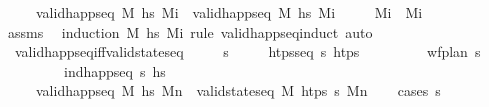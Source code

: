 \begin{isabellebody}
\ \ \ \ \ {\isachardoublequoteopen}valid{\isacharunderscore}{\kern0pt}happ{\isacharunderscore}{\kern0pt}seq\ M\ hs\ M\isactrlsub i{\isachardoublequoteclose}\ \ {\isachardoublequoteopen}valid{\isacharunderscore}{\kern0pt}happ{\isacharunderscore}{\kern0pt}seq\ M\ hs\ M\isactrlsub i{\isacharprime}{\kern0pt}{\isachardoublequoteclose}\isanewline
\ \ \ \ \ {\isachardoublequoteopen}M\isactrlsub i\ {\isacharequal}{\kern0pt}\ M\isactrlsub i{\isacharprime}{\kern0pt}{\isachardoublequoteclose}\isanewline
%
\isadelimproof
\ \ \ \ %
\endisadelimproof
%
\isatagproof
{}\isamarkupfalse%
\ assms\ \isamarkupfalse%
\ {\isacharparenleft}{\kern0pt}induction\ M\ hs\ M\isactrlsub i\ rule{\isacharcolon}{\kern0pt}\ valid{\isacharunderscore}{\kern0pt}happ{\isacharunderscore}{\kern0pt}seq{\isachardot}{\kern0pt}induct{\isacharparenright}{\kern0pt}\ auto%
\endisatagproof
{\isafoldproof}%
%
\isadelimproof
\isanewline
%
\endisadelimproof
\isanewline
\ \ \isamarkupfalse%
\ \ valid{\isacharunderscore}{\kern0pt}happ{\isacharunderscore}{\kern0pt}seq{\isacharunderscore}{\kern0pt}iff{\isacharunderscore}{\kern0pt}valid{\isacharunderscore}{\kern0pt}state{\isacharunderscore}{\kern0pt}seq{\isacharcolon}{\kern0pt}\isanewline
\ \ \ \ \ {\isasympi}s\isanewline
\ \ \ \ \ {\isachardoublequoteopen}htps{\isacharunderscore}{\kern0pt}seq\ {\isasympi}s\ htps{\isachardoublequoteclose}\isanewline
\ \ \ \ \ \ \ \ \ {\isachardoublequoteopen}wf{\isacharunderscore}{\kern0pt}plan\ {\isasympi}s{\isachardoublequoteclose}\isanewline
\ \ \ \ \ \ \ \ \ {\isachardoublequoteopen}ind{\isacharunderscore}{\kern0pt}happ{\isacharunderscore}{\kern0pt}seq\ {\isasympi}s\ hs{\isachardoublequoteclose}\isanewline
\ \ \ \ \ {\isachardoublequoteopen}valid{\isacharunderscore}{\kern0pt}happ{\isacharunderscore}{\kern0pt}seq\ M\ hs\ M\isactrlsub n\ {\isasymlongleftrightarrow}\ valid{\isacharunderscore}{\kern0pt}state{\isacharunderscore}{\kern0pt}seq\ M\ htps\ {\isasympi}s\ M\isactrlsub n{\isachardoublequoteclose}\isanewline
%
\isadelimproof
\ \ %
\endisadelimproof
%
\isatagproof
{}\isamarkupfalse%
\ {\isacharparenleft}{\kern0pt}cases\ {\isachardoublequoteopen}{\isasympi}s\ {\isacharequal}{\kern0pt}\ {\isacharbrackleft}{\kern0pt}{\isacharbrackright}{\kern0pt}{\isachardoublequoteclose}{\isacharparenright}{\kern0pt}\isanewline

\end{isabellebody}
